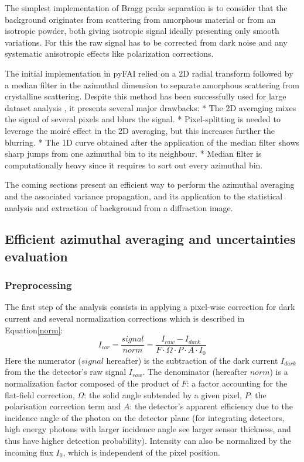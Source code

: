 \documentclass[preprint]{iucr}              %
\begin{document}
The simplest implementation of Bragg peaks separation is to consider that the background originates from scattering from amorphous material or from an isotropic powder, both giving isotropic signal ideally presenting only smooth variations.
For this the raw signal has to be corrected from dark noise and any systematic anisotropic effects like polarization corrections.

The initial implementation in pyFAI \cite{pdj2013} relied on a 2D radial transform followed by a median filter in the azimuthal dimension 
to separate amorphous scattering from crystalline scattering.
Despite this method has been successfully used for large dataset analysis \cite{brocades}, it presents several major drawbacks:
* The 2D averaging mixes the signal of several pixels and blurs the signal. 
* Pixel-splitting is needed to leverage the moiré effect in the 2D averaging, but this increases further the blurring. 
* The 1D curve obtained after the application of the median filter shows sharp jumps from one azimuthal bin to its neighbour.
* Median filter is computationally heavy since it requires to sort out every azimuthal bin.

The coming sections present an efficient way to perform the azimuthal averaging and the associated variance propagation, and its application to the statistical analysis and extraction of background from a diffraction image. 

\subsection{Efficient azimuthal averaging and uncertainties evaluation}

\subsubsection{Preprocessing}
The first step of the analysis consists in applying a pixel-wise correction for dark current and several normalization corrections\cite{pyfai_2020} which is described in Equation\ref{norm}:
\begin{equation}
\label{norm}
I_{cor} = \frac{signal}{norm}  = \frac{I_{raw} - I_{dark}}{F \cdot
\Omega \cdot P \cdot A \cdot I_0} 
\end{equation}
Here the numerator ($signal$ hereafter) is the subtraction of the dark current $I_{dark}$ from the the detector's raw signal $I_{raw}$.
The denominator (hereafter $norm$) is a normalization factor composed of the product of  $F$:  a factor accounting for the flat-field correction, $\Omega$: the solid
angle subtended by a given pixel, $P$: the polarisation correction term and
$A$: the detector's apparent efficiency due to the incidence angle of the
photon on the detector plane (for integrating detectors, high energy photons with
larger incidence angle see larger sensor thickness, and thus have higher
detection probability).
Intensity can also be normalized by the incoming flux $I_0$, which is independent of the pixel position.
\end{document}
